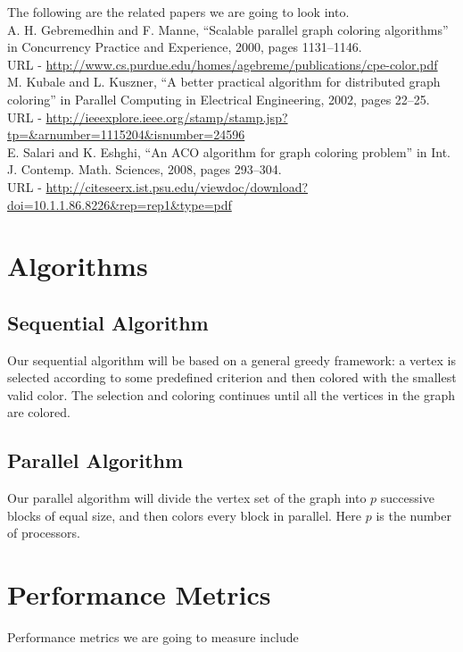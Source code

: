 \documentclass[10pt]{article}
\begin{document}
The following are the related papers we are going to look into.
~\\

A. H. Gebremedhin and F. Manne, ``Scalable parallel graph coloring algorithms'' in Concurrency Practice and Experience, 2000, pages 1131--1146.\\
URL - \href{http://www.cs.purdue.edu/homes/agebreme/publications/cpe-color.pdf}{http://www.cs.purdue.edu/homes/agebreme/publications/cpe-color.pdf}
~\\

M. Kubale and L. Kuszner, ``A better practical algorithm for distributed graph coloring'' in Parallel Computing in Electrical Engineering, 2002, pages 22--25.\\
URL - \href{http://ieeexplore.ieee.org/stamp/stamp.jsp?tp=\&arnumber=1115204\&isnumber=24596}{http://ieeexplore.ieee.org/stamp/stamp.jsp?tp=\&arnumber=1115204\&isnumber=24596}
~\\

E. Salari and K. Eshghi, ``An ACO algorithm for graph coloring problem'' in Int. J. Contemp. Math. Sciences, 2008, pages 293--304.\\
URL - \href{http://citeseerx.ist.psu.edu/viewdoc/download?doi=10.1.1.86.8226\&rep=rep1\&type=pdf}{http://citeseerx.ist.psu.edu/viewdoc/download?doi=10.1.1.86.8226\&rep=rep1\&type=pdf}

\section{Algorithms}
\subsection{Sequential Algorithm}
Our sequential algorithm will be based on a general greedy framework: a vertex is selected according to some predefined criterion and then colored with the smallest valid color. The selection and coloring continues until all the vertices in the graph are colored.
\subsection{Parallel Algorithm}
Our parallel algorithm will divide the vertex set of the graph into $p$ successive blocks of equal size, and then colors every block in parallel. Here $p$ is the number of processors.
\section{Performance Metrics}
Performance metrics we are going to measure include
\end{document}
